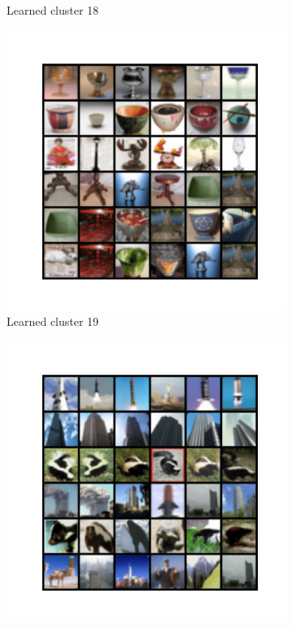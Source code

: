 \documentclass[10pt,twocolumn,letterpaper]{article}
\begin{document}
\begin{figure}
\begin{subfigure}{0.32\textwidth}
       \caption{Learned cluster 18}
     \end{subfigure}
     \hfill
     \begin{subfigure}{0.32\textwidth}
       \includegraphics[width=\linewidth,trim={1cm 2cm 1cm 2cm},clip]{figures/experiments/cifar100_cluster/nearest_class18.png}
       \caption{Learned cluster 19}
     \end{subfigure}
     \hfill
     \begin{subfigure}{0.32\textwidth}
       \includegraphics[width=\linewidth,trim={1cm 2cm 1cm 2cm},clip]{figures/experiments/cifar100_cluster/nearest_class19.png}

\end{subfigure}
\end{figure}
\end{document}
